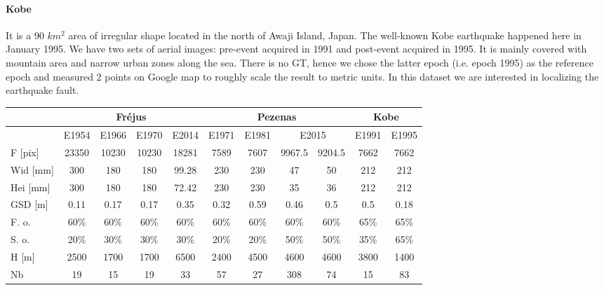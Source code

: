 \paragraph{Kobe} It is a 90 $km^2$ area of irregular shape located in the north of Awaji Island, Japan. The well-known Kobe earthquake happened here in January 1995. We have two sets of aerial images: pre-event acquired in 1991 and post-event acquired in 1995. It is mainly covered with mountain area and narrow urban zones along the sea. There is no GT, hence we chose the latter epoch (i.e. epoch 1995) as the reference epoch and measured 2 points on Google map to roughly scale the result to metric units. In this dataset we are interested in localizing the earthquake fault.
\begin{table}[htbp]
    \scriptsize %
    \centering
    \begin{tabular}{||l|c|c|c|c||c|c|c|c||c|c||}\hline
        &\multicolumn{4}{c||}{Fr{\'e}jus}&\multicolumn{4}{c||}{Pezenas}&\multicolumn{2}{c||}{Kobe}\\\hline
                &E1954&E1966&E1970&E2014&E1971&E1981&\multicolumn{2}{c||}{E2015}&E1991&E1995\\\hline\hline
        F [pix]&23350&10230&10230&\color{black}18281&7589&7607&9967.5&9204.5&7662&7662\\
        Wid [mm]&300&180&180&99.28&230&230&47&50&212&212\\
        Hei [mm]&300&180&180&72.42&230&230&35&36&212&212\\
        GSD [m]&\color{black}0.11&\color{black}0.17&0.17&0.35&0.32&0.59&0.46&0.5&0.5&0.18\\
        F. o.&60\%&60\%&60\%&60\%&   60\%&60\%&60\%&60\%&   65\%&65\%\\
        S. o.&20\%&30\%&30\%&30\%&   20\%&20\%&50\%&50\%&   35\%&65\%\\
        H  [m]&2500&1700&1700&6500&2400&4500&4600&4600&3800&1400\\
        Nb &19&15&19&33&57&27&308&74&15&83\\\hline
        

\end{tabular}
\end{table}
